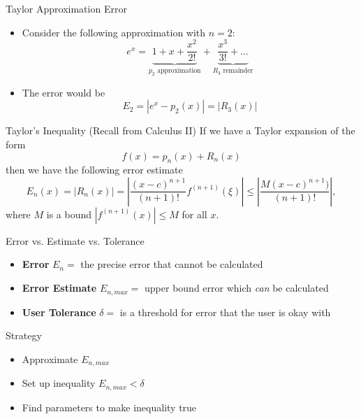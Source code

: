 \documentclass[10pt]{beamer}
\begin{document}
\begin{frame}{Taylor Approximation Error}
\begin{itemize}
\item Consider the following approximation with $n=2$:
    \begin{equation}
    e^x = \underbrace{1 + x + \frac{x^2}{2!}}_{\text{$p_2$ approximation}} + \underbrace{\frac{x^3}{3!} + \dots}_{R_3\text{ remainder}}
    \end{equation}
\item The error would be 
    $$E_2 = |e^x - p_2(x)| = \left|R_3(x)\right|$$
\end{itemize}

\begin{block}{Taylor's Inequality (Recall from Calculus II)}    
If we have a Taylor expansion of the form 
\begin{equation*}
  f(x)  = p_n(x) + R_n(x)
\end{equation*}
then we have the following error estimate 
\begin{equation*}
  E_n(x) = \left| R_n(x)\right| =\left|\frac{(x-c)^{n+1}}{(n+1)!}f^{(n+1)}(\xi)\right| \le 
            \left|\frac{M (x-c)^{n+1})}{(n+1)!}\right|,
\end{equation*}
where $M$ is a bound $|f^{(n+1)}(x)|\le M$ for all $x$. 
\end{block}
\end{frame}
\begin{frame}{Error vs. Estimate vs. Tolerance}
    \begin{itemize}
        \item \textbf{Error} $E_n=$  the precise error that cannot be calculated 
        \item \textbf{Error Estimate} $E_{n,max} = $ upper bound error which \textit{can} be calculated
        \item \textbf{User Tolerance} $\delta = $ is a threshold for error that the user is okay with
    \end{itemize}

\begin{block}{Strategy}

    \begin{itemize}
        \item Approximate $E_{n,max}$
        \item Set up inequality $E_{n,max} < \delta$
        \item Find parameters to make inequality true
    \end{itemize}
\end{block}

\end{frame}
\end{document}
